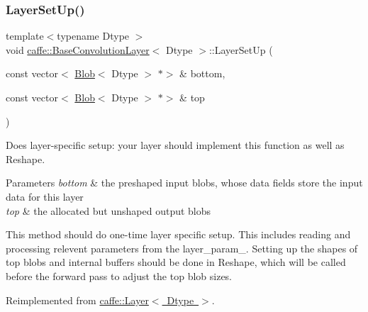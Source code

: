 \subsubsection{\texorpdfstring{Layer\+Set\+Up()}{LayerSetUp()}\hspace{0.1cm}{\footnotesize\ttfamily [1/2]}}
{\footnotesize\ttfamily template$<$typename Dtype $>$ \\
void \mbox{\hyperlink{classcaffe_1_1_base_convolution_layer}{caffe\+::\+Base\+Convolution\+Layer}}$<$ Dtype $>$\+::Layer\+Set\+Up (\begin{DoxyParamCaption}\item[{const vector$<$ \mbox{\hyperlink{classcaffe_1_1_blob}{Blob}}$<$ Dtype $>$ $\ast$$>$ \&}]{bottom,  }\item[{const vector$<$ \mbox{\hyperlink{classcaffe_1_1_blob}{Blob}}$<$ Dtype $>$ $\ast$$>$ \&}]{top }\end{DoxyParamCaption})\hspace{0.3cm}{\ttfamily [virtual]}}



Does layer-\/specific setup\+: your layer should implement this function as well as Reshape. 


\begin{DoxyParams}{Parameters}
{\em bottom} & the preshaped input blobs, whose data fields store the input data for this layer \\
\hline
{\em top} & the allocated but unshaped output blobs\\
\hline
\end{DoxyParams}
This method should do one-\/time layer specific setup. This includes reading and processing relevent parameters from the {\ttfamily layer\+\_\+param\+\_\+}. Setting up the shapes of top blobs and internal buffers should be done in {\ttfamily Reshape}, which will be called before the forward pass to adjust the top blob sizes. 

Reimplemented from \mbox{\hyperlink{classcaffe_1_1_layer_a481323a3e0972c682787f2137468c29f}{caffe\+::\+Layer$<$ Dtype $>$}}.

\mbox{\label{classcaffe_1_1_base_convolution_layer_a1527055aae7f9b74a7a82f680957162c}} 
